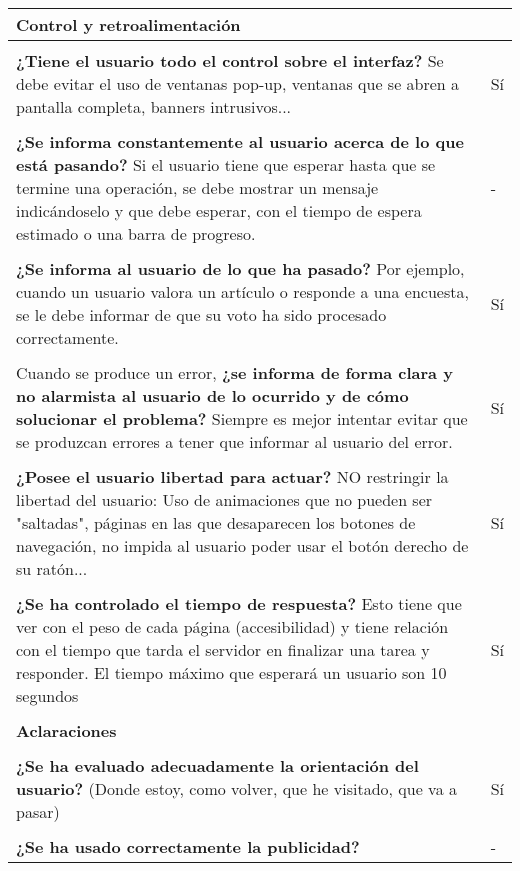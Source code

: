 \begin{longtable}[H]{p{31em}|p{5em}}
\multicolumn{2}{p{36em}}{\cellcolor[rgb]{ .851,  .886,  .953} \textbf{Control y retroalimentación}} \\ \hline \\[-1em]
\textbf{¿Tiene el usuario todo el control sobre el interfaz?} Se debe evitar el uso de ventanas pop-up, ventanas que se abren a pantalla completa, banners intrusivos...  & Sí \\ \hline \\[-1em]
\textbf{¿Se informa constantemente al usuario acerca de lo que está pasando?} Si el usuario tiene que esperar hasta que se termine una operación, se debe mostrar un mensaje indicándoselo y que debe esperar, con el tiempo de espera estimado o una barra de progreso.  & - \\ \hline \\[-1em]
\textbf{¿Se informa al usuario de lo que ha pasado?} Por ejemplo, cuando un usuario valora un artículo o responde a una encuesta, se le debe informar de que su voto ha sido procesado correctamente. & Sí \\ \hline \\[-1em]
Cuando se produce un error, \textbf{¿se informa de forma clara y no alarmista al usuario de lo ocurrido y de cómo solucionar el problema?} Siempre es mejor intentar evitar que se produzcan errores a tener que informar al usuario del error.  & Sí \\ \hline \\[-1em]
\textbf{¿Posee el usuario libertad para actuar?} NO restringir la libertad del usuario: Uso de animaciones que no pueden ser "saltadas", páginas en las que desaparecen los botones de navegación, no impida al usuario poder usar el botón derecho de su ratón... & Sí \\ \hline \\[-1em]
\textbf{¿Se ha controlado el tiempo de respuesta?} Esto tiene que ver con el peso de cada página (accesibilidad) y tiene relación con el tiempo que tarda el servidor en finalizar una tarea y responder. El tiempo máximo que esperará un usuario son 10 segundos  & Sí \\ \hline \\[-1em]
\multicolumn{2}{p{36em}}{\cellcolor[rgb]{ .851,  .886,  .953} \textbf{Aclaraciones}} \\ \hline \\[-1em]
\textbf{¿Se ha evaluado adecuadamente la orientación del usuario?} (Donde estoy, como volver, que he visitado, que va a pasar) & Sí \\ \hline \\[-1em]
\textbf{¿Se ha usado correctamente la publicidad?} & - \\ \hline
\end{longtable}



